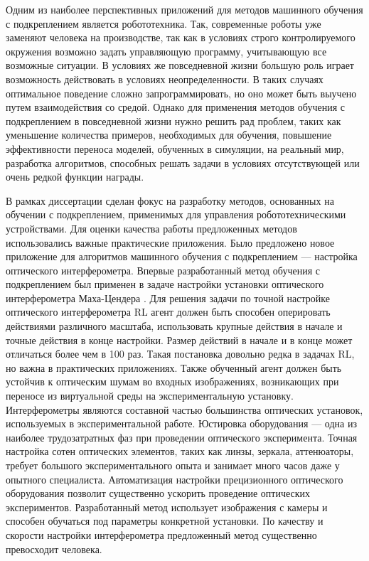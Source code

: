{\actuality} Одним из наиболее перспективных приложений для методов машинного обучения с подкреплением является робототехника. Так, современные роботы уже заменяют человека на производстве, так как в условиях строго контролируемого окружения возможно задать управляющую программу, учитывающую все возможные ситуации. В условиях же повседневной жизни большую роль играет возможность действовать в условиях неопределенности. В таких случаях оптимальное поведение сложно запрограммировать, но оно может быть выучено путем взаимодействия со средой. Однако для применения методов обучения с подкреплением в повседневной жизни нужно решить рад проблем, таких как уменьшение количества примеров, необходимых для обучения, повышение эффективности переноса моделей, обученных в симуляции, на реальный мир, разработка алгоритмов, способных решать задачи в условиях отсутствующей или очень редкой функции награды. 

В рамках диссертации сделан фокус на разработку методов, основанных на обучении с подкреплением, применимых для управления робототехническими устройствами. Для оценки качества работы предложенных методов использовались важные практические приложения. Было предложено новое приложение для алгоритмов машинного обучения с подкреплением --- настройка оптического интерферометра. Впервые разработанный метод обучения с подкреплением был применен в задаче настройки установки оптического интерферометра Маха-Цендера \cite{interferobot, v2}. Для решения задачи по точной настройке оптического интерферометра RL агент должен быть способен оперировать действиями различного масштаба, использовать крупные действия в начале и точные действия в конце настройки. Размер действий в начале и в конце может отличаться более чем в 100 раз. Такая постановка довольно редка в задачах RL, но важна в практических приложениях. Также обученный агент должен быть устойчив к оптическим шумам во входных изображениях, возникающих при переносе из виртуальной среды на экспериментальную установку. Интерферометры являются составной частью большинства оптических установок, используемых в экспериментальной работе. Юстировка оборудования --- одна из наиболее трудозатратных фаз при проведении оптического эксперимента. Точная настройка сотен оптических элементов, таких как линзы, зеркала, аттенюаторы, требует большого экспериментального опыта и занимает много часов даже у опытного специалиста. Автоматизация настройки прецизионного оптического оборудования позволит существенно ускорить проведение оптических экспериментов. Разработанный метод использует изображения с камеры и способен обучаться под параметры конкретной установки. По качеству и скорости настройки интерферометра предложенный метод существенно превосходит человека. 

